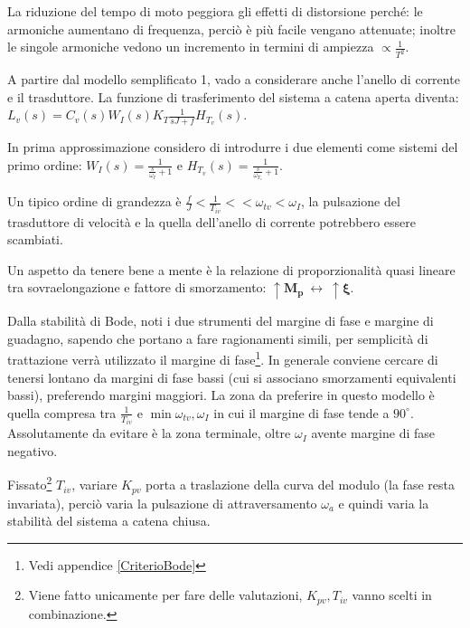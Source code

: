 La riduzione del tempo di moto peggiora gli effetti di distorsione perché: le armoniche aumentano di frequenza, perciò è più facile vengano attenuate; inoltre le singole armoniche vedono un incremento in termini di ampiezza \(\propto \frac{1}{T^2}\).

A partire dal modello semplificato 1, vado a considerare anche l'anello di corrente e il trasduttore.
La funzione di trasferimento del sistema a catena aperta diventa: \(L_v(s)=C_v(s)W_I(s)K_T \frac{1}{sJ+f}H_{T_v}(s)\).

In prima approssimazione considero di introdurre i due elementi come sistemi del primo ordine: \(W_I(s) = \frac{1}{\frac{s}{\omega_I}+1}\) e \(H_{T_v}(s) = \frac{1}{\frac{s}{\omega_{T_v}}+1}\).

Un tipico ordine di grandezza è \(\frac{f}{J} < \frac{1}{T_{iv}} << \omega_{tv} < \omega_I\), la pulsazione del trasduttore di velocità e la quella dell'anello di corrente potrebbero essere scambiati.

Un aspetto da tenere bene a mente è la relazione di proporzionalità quasi lineare tra sovraelongazione e fattore di smorzamento: \(\uparrow \mathbf{M_p} \ \leftrightarrow \ \uparrow \boldsymbol{\xi}\).

Dalla stabilità di Bode, noti i due strumenti del margine di fase e margine di guadagno, sapendo che portano a fare ragionamenti simili, per semplicità di trattazione verrà utilizzato il margine di fase\footnote{Vedi appendice \ref{CriterioBode}}.
In generale conviene cercare di tenersi lontano da margini di fase bassi (cui si associano smorzamenti equivalenti bassi), preferendo margini maggiori. La zona da preferire in questo modello è quella compresa tra \(\frac{1}{T_{iv}}\) e \(\min{\omega_{tv},\omega_I}\) in cui il margine di fase tende a \(90^\circ\). Assolutamente da evitare è la zona terminale, oltre \(\omega_I\) avente margine di fase negativo.

Fissato\footnote{Viene fatto unicamente per fare delle valutazioni, \(K_{pv}, T_{iv}\) vanno scelti in combinazione. {\color{red}{Vanno effettivamente scelti in combinazione?}}} \(T_{iv}\), variare \(K_{pv}\) porta a traslazione della curva del modulo (la fase resta invariata), perciò varia la pulsazione di attraversamento \(\omega_a\) e quindi varia la stabilità del sistema a catena chiusa.


